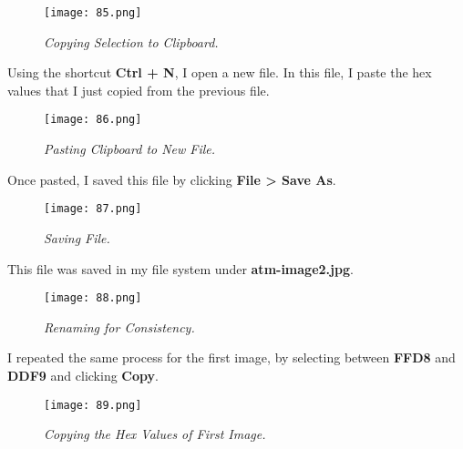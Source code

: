 \begin{figure}[H]
    \setlength{\abovecaptionskip}{20pt}
    \setlength{\belowcaptionskip}{0pt}
    \centering
    \texttt{[image: 85.png]}
    \captionsetup{justification=centering}
    \caption{\textit{Copying Selection to Clipboard.}}
    \label{fig:85}
\end{figure}
\vspace{-10pt}

Using the shortcut \textbf{Ctrl + N}, I open a new file. In this file, I paste the hex values that I just copied from the previous file. 

\begin{figure}[H]
    \setlength{\abovecaptionskip}{20pt}
    \setlength{\belowcaptionskip}{0pt}
    \centering
    \texttt{[image: 86.png]}
    \captionsetup{justification=centering}
    \caption{\textit{Pasting Clipboard to New File.}}
    \label{fig:86}
\end{figure}
\vspace{-10pt}

Once pasted, I saved this file by clicking \textbf{File > Save As}.

\begin{figure}[H]
    \setlength{\abovecaptionskip}{20pt}
    \setlength{\belowcaptionskip}{0pt}
    \centering
    \texttt{[image: 87.png]}
    \captionsetup{justification=centering}
    \caption{\textit{Saving File.}}
    \label{fig:87}
\end{figure}
\vspace{-10pt}

This file was saved in my file system under \textbf{atm-image2.jpg}.

\begin{figure}[H]
    \setlength{\abovecaptionskip}{20pt}
    \setlength{\belowcaptionskip}{0pt}
    \centering
    \texttt{[image: 88.png]}
    \captionsetup{justification=centering}
    \caption{\textit{Renaming for Consistency.}}
    \label{fig:88}
\end{figure}
\vspace{-10pt}

I repeated the same process for the first image, by selecting between \textbf{FFD8} and \textbf{DDF9} and clicking \textbf{Copy}.

\begin{figure}[H]
    \setlength{\abovecaptionskip}{20pt}
    \setlength{\belowcaptionskip}{0pt}
    \centering
    \texttt{[image: 89.png]}
    \captionsetup{justification=centering}
    \caption{\textit{Copying the Hex Values of First Image.}}
    \label{fig:89}
\end{figure}
\vspace{-10pt}

